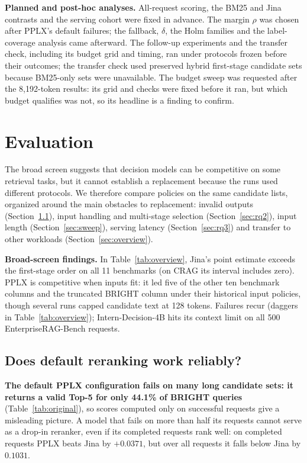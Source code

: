 \documentclass[conference]{IEEEtran}
\begin{document}
{\textbf{Planned and post-hoc analyses.} All-request scoring, the BM25 and Jina contrasts and the serving cohort were fixed in advance. The margin $\rho$ was chosen after PPLX's default failures; the fallback, $\delta$, the Holm families and the label-coverage analysis came afterward. The follow-up experiments and the transfer check, including its budget grid and timing, ran under protocols frozen before their outcomes; the transfer check used preserved hybrid first-stage candidate sets because BM25-only sets were unavailable. The budget sweep was requested after the 8,192-token results: its grid and checks were fixed before it ran, but which budget qualifies was not, so its headline is a finding to confirm.

\section{Evaluation}
The broad screen suggests that decision models can be competitive on some retrieval tasks, but it cannot establish a replacement because the runs used different protocols. We therefore compare policies on the same candidate lists, organized around the main obstacles to replacement: invalid outputs (Section~\ref{sec:rq1}), input handling and multi-stage selection (Section~\ref{sec:rq2}), input length (Section~\ref{sec:sweep}), serving latency (Section~\ref{sec:rq3}) and transfer to other workloads (Section~\ref{sec:overview}).

\textbf{Broad-screen findings.} In Table~\ref{tab:overview}, Jina's point estimate exceeds the first-stage order on all 11 benchmarks (on CRAG its interval includes zero). PPLX is competitive when inputs fit: it led five of the other ten benchmark columns and the truncated BRIGHT column under their historical input policies, though several runs capped candidate text at 128 tokens. Failures recur (daggers in Table~\ref{tab:overview}); Intern-Decision-4B hits its context limit on all 500 EnterpriseRAG-Bench requests.

\subsection{Does default reranking work reliably?}\label{sec:rq1}
\textbf{The default PPLX configuration fails on many long candidate sets: it returns a valid Top-5 for only 44.1\% of BRIGHT queries} (Table~\ref{tab:original}), so scores computed only on successful requests give a misleading picture. A model that fails on more than half its requests cannot serve as a drop-in reranker, even if its completed requests rank well: on completed requests PPLX beats Jina by $+0.0371$, but over all requests it falls below Jina by $0.1031$.

}
\end{document}

